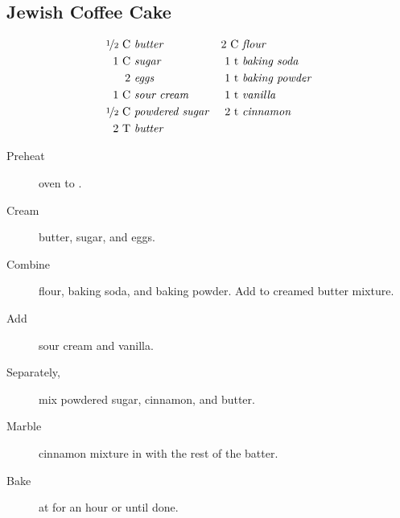 \subsection{Jewish Coffee Cake}

\begin{align*}
    \text{\nicefrac{1}{2}~C} &~\text{\emph{butter}}         & \text{2~C} &~\text{\emph{flour}} \\
    \text{1~C} &~\text{\emph{sugar}}                        & \text{1~t} &~\text{\emph{baking soda}} \\
    \text{2} &~\text{\emph{eggs}}                           & \text{1~t} &~\text{\emph{baking powder}} \\
    \text{1~C} &~\text{\emph{sour cream}}                   & \text{1~t} &~\text{\emph{vanilla}} \\
    \text{\nicefrac{1}{2}~C} &~\text{\emph{powdered sugar}} & \text{2~t} &~\text{\emph{cinnamon}} \\
    \text{2~T} &~\text{\emph{butter}}                       & \text{} &~\text{\emph{}}
\end{align*}

\begin{description}
    \item[Preheat]oven to .
    \item[Cream]butter, sugar, and eggs.
    \item[Combine]flour, baking soda, and baking powder. Add to creamed butter mixture.
    \item[Add]sour cream and vanilla.
    \item[Separately,]mix powdered sugar, cinnamon, and butter.
    \item[Marble]cinnamon mixture in with the rest of the batter.
    \item[Bake]at  for an hour or until done.
\end{description}

\pagebreak
